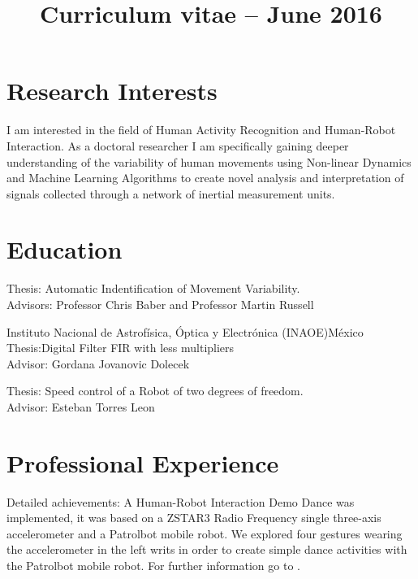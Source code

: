 \documentclass[10pt,a4paper,roman]{moderncv}
\title{Curriculum vitae -- June 2016}    %
\begin{document}
\makecvtitle

\section{Research Interests} 
I am interested in the field of Human Activity Recognition and Human-Robot Interaction. 
As a doctoral researcher I am specifically gaining deeper understanding of the variability 
of human movements using Non-linear Dynamics and Machine Learning Algorithms
to create novel analysis and interpretation of signals collected through a network of inertial measurement units.


\section{Education}

  {Thesis: Automatic Indentification of Movement Variability.
   \\ Advisors: Professor Chris Baber and  Professor Martin Russell  } 
 
  {Instituto Nacional de Astrof\'isica, \'Optica y Electr\'onica (INAOE)}{M\'exico}{} 
  {Thesis:Digital Filter FIR with less multipliers
  \href{https://sites.google.com/site/perezxochicale/docs/MScThesis.pdf}{\faFilePdfO}
  \\ Advisor: Gordana Jovanovic Dolecek}

  {Thesis: Speed control of a Robot of two degrees of freedom.
  \href{https://sites.google.com/site/perezxochicale/docs/BachelorProject.pdf}{\faFilePdfO}
  \\ Advisor: Esteban Torres Leon}


\section{Professional Experience}

{Detailed achievements: A Human-Robot Interaction Demo Dance was implemented, it was based on a 
ZSTAR3 Radio Frequency single three-axis accelerometer and a Patrolbot mobile robot. 
We explored four gestures wearing the accelerometer in the left writs 
in order to create simple dance activities with the Patrolbot mobile robot.
For further information go to \href{https://sites.google.com/site/perezxochicale/projects/demodance}{\faExternalLink}.}
\end{document}
